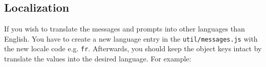 \subsection{Localization}

If you wish to translate the messages and prompts into other languages than English. You have to create a new language entry in the \texttt{util/messages.js} with the new locale code e.g. \texttt{fr}. Afterwards, you should keep the object keys intact by translate the values into the desired language. For example:


